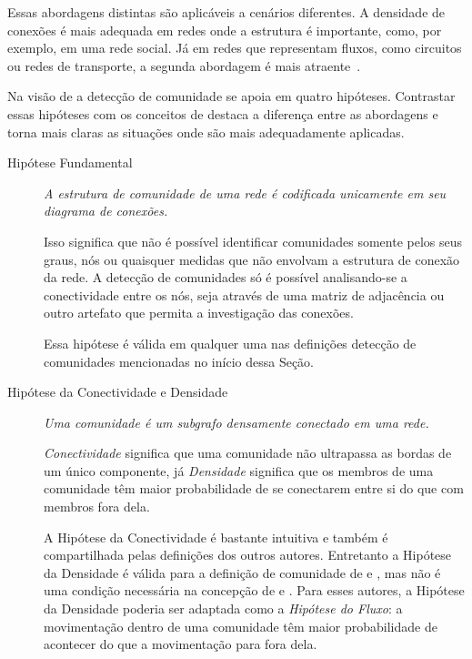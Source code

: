 \documentclass[12pt,a4paper]{article}
\begin{document}
Essas abordagens distintas são aplicáveis a cenários diferentes. A densidade de conexões é mais adequada em redes onde a estrutura é importante, como, por exemplo, em uma rede social. Já em redes que representam fluxos, como circuitos ou redes de transporte, a segunda abordagem é mais atraente~\cite{Rosvall2009-sd}.

Na visão de  a detecção de comunidade se apoia em quatro hipóteses. Contrastar essas hipóteses com os conceitos de  destaca a diferença entre as abordagens e torna mais claras as situações onde são mais adequadamente aplicadas.

\begin{description}
\item [Hipótese Fundamental] \textit{A estrutura de comunidade de uma rede é codificada unicamente em seu diagrama de conexões.}

Isso significa que não é possível identificar comunidades somente pelos seus graus, nós ou quaisquer medidas que não envolvam a estrutura de conexão da rede. A detecção de comunidades só é possível analisando-se a conectividade entre os nós, seja através de uma matriz de adjacência ou outro artefato que permita a investigação das conexões.

Essa hipótese é válida em qualquer uma nas definições detecção de comunidades mencionadas no início dessa Seção.

\item [Hipótese da Conectividade e Densidade] \textit{Uma comunidade é um subgrafo densamente conectado em uma rede.}

\textit{Conectividade} significa que uma comunidade não ultrapassa as bordas de um único componente, já \textit{Densidade} significa que os membros de uma comunidade têm maior probabilidade de se conectarem entre si do que com membros fora dela.

A Hipótese da Conectividade é bastante intuitiva e também é compartilhada pelas definições dos outros autores. Entretanto a Hipótese da Densidade é válida para a definição de comunidade de  e , mas não é uma condição necessária na concepção de  e . Para esses autores, a Hipótese da Densidade poderia ser adaptada como a \textit{Hipótese do Fluxo}: a movimentação dentro de uma comunidade têm maior probabilidade de acontecer do que a movimentação para fora dela.


\end{description}
\end{document}
